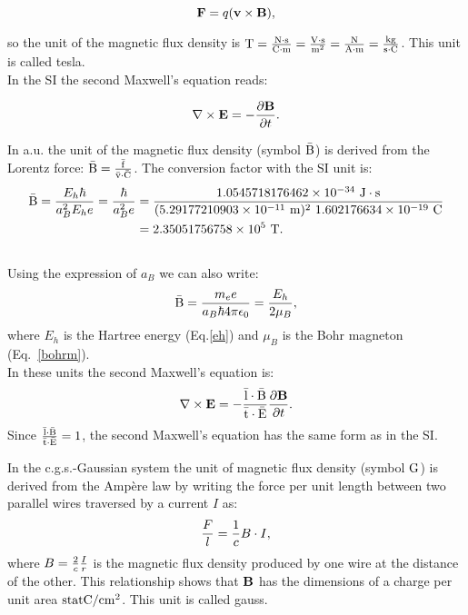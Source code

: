 \documentclass[12pt,a4paper,twoside]{report}
\def\hbarf{1.0545718176462\times 10^{-34}}
\def\barl{5.29177210903\times 10^{-11}}
\def\barc{1.602176634\times 10^{-19}}
\def\barb{2.35051756758\times 10^{5}}
\begin{document}
{\begin{tcolorbox}
\begin{equation}
{\bf F}=q ({\bf v} \times {\bf B}),
\label{lforce}
\end{equation}
\end{tcolorbox}

so the unit of the magnetic flux density is ${\rm T}={{\rm N}\cdot {\rm s}\over {\rm C}\cdot {\rm m}} = 
{{\rm V} \cdot {\rm s} \over {\rm m}^2}={{\rm N} \over {\rm A}\cdot {\rm m}}={{\rm kg} \over {\rm s} \cdot {\rm C}}$. 
This unit is called tesla. \\
In the SI the second Maxwell's equation reads:

\begin{tcolorbox}
\begin{equation}
\nabla \times {\bf E}=-{\partial {\bf B} \over \partial t}.
\end{equation} 
\end{tcolorbox}

{\color{web-blue} In a.u. the unit of the magnetic flux density 
(symbol ${\rm \bar B}$) is derived from the Lorentz force: 
${\rm \bar B}= {{\rm \bar f} \over {\rm \bar v} \cdot
{\rm \bar C}}$. The conversion factor with the SI unit is:
\begin{align}
{\rm \bar B} = {E_h \hbar \over a_B^2 E_h e}={\hbar \over a_B^2 e}&=
{\hbarf\ {\rm J}\cdot {\rm s} \over (\barl\ {\rm m})^2\ \barc\ {\rm C}}\nonumber
\\&= \barb\ {\rm T}.
\end{align}
\\

Using the expression of $a_B$ we can also write:
\begin{equation}
{\rm \bar B}= {m_e e \over a_B \hbar 4 \pi \epsilon_0}=
{E_h \over 2 \mu_B},
\end{equation}
where $E_h$ is the Hartree energy (Eq.\ref{eh}) and $\mu_B$ is the Bohr 
magneton (Eq.~\ref{bohrm}).
\\
In these units the second Maxwell's equation is:
\begin{equation}
\nabla \times {\bf E}=-{{\rm \bar l}\cdot {\rm \bar B} \over {\rm \bar t}\cdot {\rm \bar E}} 
{\partial {\bf B} \over \partial t}.
\label{maxwell2gen}
\end{equation}
Since ${{\rm \bar l}\cdot {\rm \bar B} \over {\rm \bar t} \cdot {\rm \bar E}}=1$, the second Maxwell's
equation has the same form as in the SI.
}
\\

{\color{orange} In the c.g.s.-Gaussian system the unit of magnetic
flux density (symbol ${\rm G}$) is derived from the Amp\`ere law by writing 
the force per unit length between two parallel wires traversed by 
a current $I$ as:
\begin{equation}
{F \over l} = {1\over c} B \cdot I,
\end{equation}
where $B={2\over c} {I \over r}$ is the magnetic flux density produced by 
one wire at the distance of the other. 
This relationship shows that ${\bf B}$ has the dimensions of a
charge per unit area ${\rm statC}/{\rm cm}^2$. This unit is called gauss.

}}
\end{document}

